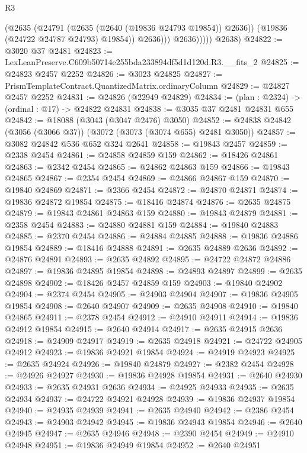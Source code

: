 \begin{lexlean}{R3}
\begin{coremodule}
                      (@2635
                        (@24791 (@2635 (@2640 (@19836 @24793 @19854)) @2636))
                        (@19836 (@24722 @24787 @24793) @19854))
                      @2636)))
                @2636)))))
      @2638)
@24822 := @3020 @37 @2481
@24823 := LexLeanPreserve.C609b50714e255bda233894df5d1d120d.R3.__fits_2
@24825 := @24823 @2457 @2252
@24826 := @3023 @24825
@24827 := PrismTemplateContract.QuantizedMatrix.ordinaryColumn
@24829 := @24827 @2457 @2252
@24831 := @24826 (@22949 @24829)
@24834 := (plan : @2324) -> (ordinal : @17) -> @24822 @24831
@24838 := @3035 @37 @2481 @24831 @655
@24842 := @18088 (@3043 (@3047 @2476) @3050)
@24852 := @24838 @24842 (@3056 (@3066 @37)) (@3072 (@3073 (@3074 @655) @2481 @3050))
@24857 := @3082 @24842 @536 @652 @324 @2641
@24858 := @19843 @2457
@24859 := @2338 @2454
@24861 := @24858 @24859 @159
@24862 := @18426 @24861
@24863 := @2342 @2454
@24865 := @24862 @24863 @159
@24866 := @19843 @24865
@24867 := @2354 @2454
@24869 := @24866 @24867 @159
@24870 := @19840 @24869
@24871 := @2366 @2454
@24872 := @24870 @24871
@24874 := @19836 @24872 @19854
@24875 := @18416 @24874
@24876 := @2635 @24875
@24879 := @19843 @24861 @24863 @159
@24880 := @19843 @24879
@24881 := @2358 @2454
@24883 := @24880 @24881 @159
@24884 := @19840 @24883
@24885 := @2370 @2454
@24886 := @24884 @24885
@24888 := @19836 @24886 @19854
@24889 := @18416 @24888
@24891 := @2635 @24889 @2636
@24892 := @24876 @24891
@24893 := @2635 @24892
@24895 := @24722 @24872 @24886
@24897 := @19836 @24895 @19854
@24898 := @24893 @24897
@24899 := @2635 @24898
@24902 := @18426 @2457 @24859 @159
@24903 := @19840 @24902
@24904 := @2374 @2454
@24905 := @24903 @24904
@24907 := @19836 @24905 @19854
@24908 := @2640 @24907
@24909 := @2635 @24908
@24910 := @19840 @24865
@24911 := @2378 @2454
@24912 := @24910 @24911
@24914 := @19836 @24912 @19854
@24915 := @2640 @24914
@24917 := @2635 @24915 @2636
@24918 := @24909 @24917
@24919 := @2635 @24918
@24921 := @24722 @24905 @24912
@24923 := @19836 @24921 @19854
@24924 := @24919 @24923
@24925 := @2635 @24924
@24926 := @19840 @24879
@24927 := @2382 @2454
@24928 := @24926 @24927
@24930 := @19836 @24928 @19854
@24931 := @2640 @24930
@24933 := @2635 @24931 @2636
@24934 := @24925 @24933
@24935 := @2635 @24934
@24937 := @24722 @24921 @24928
@24939 := @19836 @24937 @19854
@24940 := @24935 @24939
@24941 := @2635 @24940
@24942 := @2386 @2454
@24943 := @24903 @24942
@24945 := @19836 @24943 @19854
@24946 := @2640 @24945
@24947 := @2635 @24946
@24948 := @2390 @2454
@24949 := @24910 @24948
@24951 := @19836 @24949 @19854
@24952 := @2640 @24951

\end{coremodule}
\end{lexlean}
